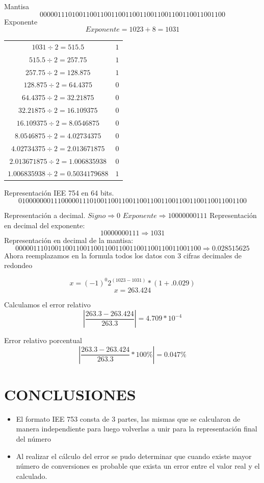 \documentclass[12pt]{article}
\begin{document}
Mantisa 
$$0000 0111 0100 1100 1100 1100 1100 1100 1100 1100 1100 1100 1100$$
Exponente
$$Exponente= 1023+8=1031$$
\begin{center}
    \begin{tabular}{|c|c|}
        \hline
        $1031 \div 2 = 515.5$ & $1$\\
        $515.5 \div 2 = 257.75$ & $1$\\
        $257.75 \div 2 = 128.875$ & $1$\\
        $128.875 \div 2 = 64.4375$ & $0$\\
        $64.4375 \div 2 = 32.21875$ & $0$\\
        $32.21875 \div 2 = 16.109375$ & $0$\\
        $16.109375 \div 2 = 8.0546875$ & $0$\\
        $8.0546875 \div 2 = 4.02734375$ & $0$\\
        $4.02734375 \div 2 = 2.013671875$ & $0$\\
        $2.013671875 \div 2 = 1.006835938$ & $0$\\
        $1.006835938\div 2 = 0.5034179688$ & $1$\\
        \hline
      \end{tabular} 
\end{center}
Representación IEE 754 en 64 bits.
$$0 10000000111 0000 0111 0100 1100 1100 1100 1100 1100 1100 1100 1100 1100 1100$$

Representación a decimal.
\newline
$Signo \Rightarrow 0$
\newline$Exponente \Rightarrow 10000000111$ 
\newline Representación en decimal del exponente:
$$10000000111 \Rightarrow 1031$$
Representación en decimal de la mantisa:
$$0000 0111 0100 1100 1100 1100 1100 1100 1100 1100 1100 1100 1100 \Rightarrow 0.028515625$$
Ahora reemplazamos en la formula todos los datos con 3 cifras decimales de redondeo

$$x = (-1)^0 2^(1023-1031)*(1+.0.029)$$
$$x = 263.424$$

Calculamos el error relativo
$$
\left| \frac{263.3 - 263.424}{263.3} \right| = 4.709*10^{-4}
$$

Error relativo porcentual
$$
\left| \frac{263.3 - 263.424}{263.3}  *100\% \right| = 0.047\%
$$ 


\vspace{0.5cm}

\section*{CONCLUSIONES}
\begin{itemize}
    \item El formato IEE 753 consta de 3 partes, las mismas que se calcularon de manera independiente para luego volverlas a unir para la representación final del número
    \item Al realizar el cálculo del error se pudo determinar que cuando existe mayor número de conversiones es probable que exista un error entre el valor real y el calculado.
\end{itemize}
\vspace{0.5cm}
\end{document}
